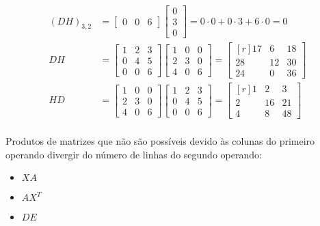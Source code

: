 \begin{align*}
	(DH)_{3,2}
	&=
	\begin{bmatrix*}
		0 & 0 & 6
	\end{bmatrix*}
	\begin{bmatrix*}
		0\\
		3\\
		0
	\end{bmatrix*}
	= 0 \cdot 0 + 0 \cdot 3 + 6 \cdot 0 = 0\\
	DH
	&=
	\begin{bmatrix}
		1 & 2 & 3\\
		0 & 4 & 5\\
		0 & 0 & 6
	\end{bmatrix}
	\begin{bmatrix}
		1 & 0 & 0\\
		2 & 3 & 0\\
		4 & 0 & 6
	\end{bmatrix}
	=
	\begin{bmatrix*}[r]
		17 & 6  & 18\\
		28 & 12 & 30\\
		24 & 0  & 36
	\end{bmatrix*}
	\\
	HD
	&=
	\begin{bmatrix}
		1 & 0 & 0\\
		2 & 3 & 0\\
		4 & 0 & 6
	\end{bmatrix}
	\begin{bmatrix}
		1 & 2 & 3\\
		0 & 4 & 5\\
		0 & 0 & 6
	\end{bmatrix}
	=
	\begin{bmatrix*}[r]
		1 & 2  & 3\\
		2 & 16 & 21\\
		4 & 8  & 48
	\end{bmatrix*}
\end{align*}



\paragraph{} Produtos de matrizes que não são possíveis devido às colunas do
primeiro operando divergir do número de linhas do segundo operando:

\begin{itemize}
	\item $X A$
	\item $A X^T$
	\item $D E$
\end{itemize}

